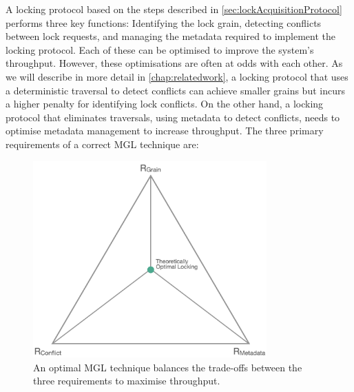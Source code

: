 A locking protocol based on the steps described in \cref{sec:lockAcquisitionProtocol} performs three key functions: Identifying the lock grain, detecting conflicts between lock requests, and managing the metadata required to implement the locking protocol. Each of these can be optimised to improve the system's throughput. However, these optimisations are often at odds with each other. As we will describe in more detail in \cref{chap:relatedwork}, a locking protocol that uses a deterministic traversal to detect conflicts can achieve smaller grains but incurs a higher penalty for identifying lock conflicts. On the other hand, a locking protocol that eliminates traversals, using metadata to detect conflicts, needs to optimise metadata management to increase throughput. The three primary requirements of a correct MGL technique are:

\begin{figure}
    \centering
    \captionsetup{justification=centering}
    \includegraphics[width=0.8\textwidth]{figures/IdealMGLTechnique.png}
    \caption{An optimal MGL technique balances the trade-offs between the three requirements to maximise throughput.}
    \label{fig:lock_throughput}
\end{figure}

